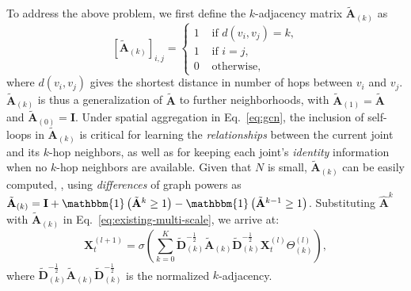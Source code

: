 \documentclass[10pt,twocolumn,letterpaper]{article}
\begin{document}
To address the above problem, we first define the $k$-adjacency matrix $\tilde{\mathbf{A}}_{(k)}$ as
\begin{equation} \label{eq:k-adjacency}
    [\tilde{\mathbf{A}}_{(k)}]_{i,j} = \left\{
        \begin{array}{ll}
            {1} & {\text { if } d(v_i, v_j) = k }, \\
            {1} & {\text { if } i = j }, \\
            {0} & {\text { otherwise, }}
        \end{array}\right.
\end{equation}
where $d(v_i, v_j)$ gives the shortest distance in number of hops between $v_i$ and $v_j$. $\tilde{\mathbf{A}}_{(k)}$ is thus a generalization of $\tilde{\mathbf{A}}$ to further neighborhoods, with $\tilde{\mathbf{A}}_{(1)} = \tilde{\mathbf{A}}$ and $\tilde{\mathbf{A}}_{(0)} = \mathbf{I}$.
Under spatial aggregation in Eq.~\ref{eq:gcn}, the inclusion of self-loops in $\tilde{\mathbf{A}}_{(k)}$ is critical for learning the \textit{relationships} between the current joint and its $k$-hop neighbors, as well as for keeping each joint's \textit{identity} information when no $k$-hop neighbors are available. Given that $N$ is small, $\tilde{\mathbf{A}}_{(k)}$ can be easily computed,
\eg, using \textit{differences} of graph powers as
$\tilde{\mathbf{A}}_{(k)} = \mathbf{I} + \mathbbm{1}\left(\tilde{\mathbf{A}}^k \geq 1\right) - \mathbbm{1}\left(\tilde{\mathbf{A}}^{k-1} \geq 1\right)$.
Substituting $\widehat{\mathbf{A}}^{k}$ with $\tilde{\mathbf{A}}_{(k)}$ in Eq.~\ref{eq:existing-multi-scale}, we arrive at:
\begin{equation} \label{eq:disentangle-multi-scale}
    \mathbf{X}_t^{(l+1)} = \sigma \left(
            \sum_{k=0}^{K}
                \tilde{\mathbf{D}}_{(k)}^{-\frac{1}{2}}
                \tilde{\mathbf{A}}_{(k)}
                \tilde{\mathbf{D}}_{(k)}^{-\frac{1}{2}}
                \mathbf{X}_t^{(l)}
                \Theta^{(l)}_{(k)}
        \right),
\end{equation}
where $\tilde{\mathbf{D}}_{(k)}^{-\frac{1}{2}}\tilde{\mathbf{A}}_{(k)}\tilde{\mathbf{D}}_{(k)}^{-\frac{1}{2}}$ is the normalized \cite{GCN} $k$-adjacency.
\end{document}
